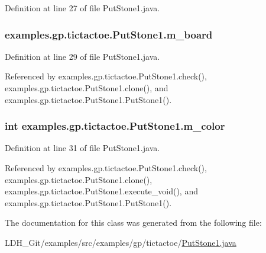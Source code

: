Definition at line 27 of file Put\-Stone1.\-java.

\hypertarget{classexamples_1_1gp_1_1tictactoe_1_1_put_stone1_a1d3c58f3ff83cdce77bdf261ef789342}{
\subsubsection[{m\-\_\-board}]{ examples.\-gp.\-tictactoe.\-Put\-Stone1.\-m\-\_\-board\hspace{0.3cm}{\ttfamily [private]}}}\label{classexamples_1_1gp_1_1tictactoe_1_1_put_stone1_a1d3c58f3ff83cdce77bdf261ef789342}


Definition at line 29 of file Put\-Stone1.\-java.



Referenced by examples.\-gp.\-tictactoe.\-Put\-Stone1.\-check(), examples.\-gp.\-tictactoe.\-Put\-Stone1.\-clone(), and examples.\-gp.\-tictactoe.\-Put\-Stone1.\-Put\-Stone1().

\hypertarget{classexamples_1_1gp_1_1tictactoe_1_1_put_stone1_a84ab709b5107b7202e796b3b8233188c}{
\subsubsection[{m\-\_\-color}]{\setlength{\rightskip}{0pt plus 5cm}int examples.\-gp.\-tictactoe.\-Put\-Stone1.\-m\-\_\-color\hspace{0.3cm}{\ttfamily [private]}}}\label{classexamples_1_1gp_1_1tictactoe_1_1_put_stone1_a84ab709b5107b7202e796b3b8233188c}


Definition at line 31 of file Put\-Stone1.\-java.



Referenced by examples.\-gp.\-tictactoe.\-Put\-Stone1.\-check(), examples.\-gp.\-tictactoe.\-Put\-Stone1.\-clone(), examples.\-gp.\-tictactoe.\-Put\-Stone1.\-execute\-\_\-void(), and examples.\-gp.\-tictactoe.\-Put\-Stone1.\-Put\-Stone1().



The documentation for this class was generated from the following file\-:\begin{DoxyCompactItemize}
\item 
L\-D\-H\-\_\-\-Git/examples/src/examples/gp/tictactoe/\hyperlink{_put_stone1_8java}{Put\-Stone1.\-java}\end{DoxyCompactItemize}
